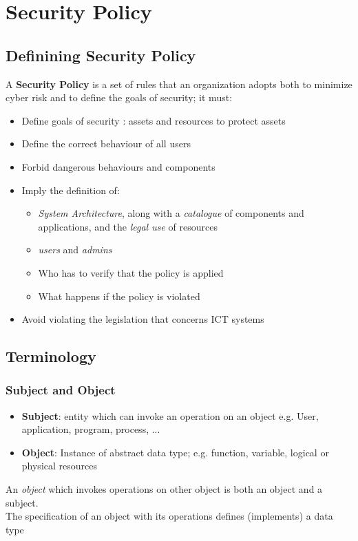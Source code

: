 \chapter{Security Policy}
\label{chapter:security_policy}

\section{Definining Security Policy}
A \textbf{Security Policy} is a set of rules that an organization adopts both to minimize cyber risk and to define the goals of security;
it must:
\begin{itemize}
    \item Define goals of security : assets and resources to protect assets
    \item Define the correct behaviour of all users
    \item Forbid dangerous behaviours and components
    \item Imply the definition of: 
    \begin{itemize}
        \item \textit{System Architecture}, along with a \textit{catalogue} of components and applications, and the \textit{legal use} of resources
        \item \textit{users} and \textit{admins}
        \item Who has to verify that the policy is applied
        \item What happens if the policy is violated
    \end{itemize}
    \item Avoid violating the legislation that concerns ICT systems
\end{itemize}

\section{Terminology}
\subsection{Subject and Object}
\begin{itemize}
    \item \textbf{Subject}: entity which can invoke an operation on an object
    e.g. User, application, program, process, ... 
    \item \textbf{Object}:  Instance of abstract data type; e.g. function, variable, logical or physical resources
\end{itemize}
An \textit{object} which invokes operations on other object is both an object and a subject.\\
The specification of an object with its operations
defines (implements) a data type


